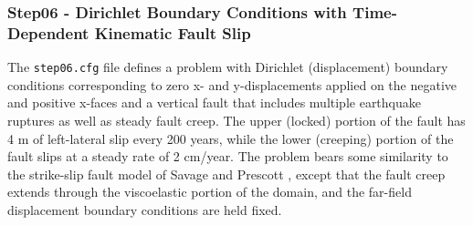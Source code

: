 \subsubsection{Step06 - Dirichlet Boundary Conditions with Time-Dependent Kinematic
Fault Slip}

The \texttt{step06.cfg} file defines a problem with Dirichlet (displacement)
boundary conditions corresponding to zero x- and y-displacements applied
on the negative and positive x-faces and a vertical fault that includes
multiple earthquake ruptures as well as steady fault creep. The upper
(locked) portion of the fault has 4 m of left-lateral slip every 200
years, while the lower (creeping) portion of the fault slips at a
steady rate of 2 cm/year. The problem bears some similarity to the
strike-slip fault model of Savage and Prescott \cite{Savage:Prescott:1978},
except that the fault creep extends through the viscoelastic portion
of the domain, and the far-field displacement boundary conditions
are held fixed.

